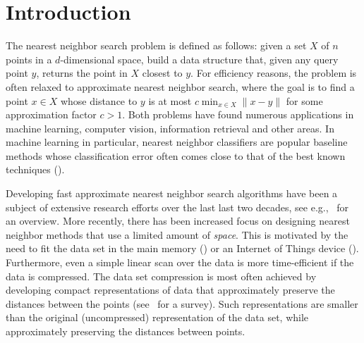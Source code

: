 \section{Introduction}


The nearest neighbor search problem is defined as follows: given a set $X$ of $n$ points in a $d$-dimensional space, build a data structure that, given any query point $y$, returns the point in $X$ closest to $y$. For efficiency reasons, the problem is often relaxed to approximate nearest neighbor search, where the goal is to find a point $x \in X$ whose distance to $y$ is at most $c \min_{x \in X} \|x-y\|$ for some approximation factor $c>1$. Both problems have found numerous applications in machine learning, computer vision,  information retrieval and other areas. In machine learning in particular, nearest neighbor classifiers are popular baseline methods whose classification error often comes close to that of the best known techniques (\cite{efros}).


Developing fast approximate nearest neighbor search algorithms have been a subject of extensive research efforts over the last last two decades, see  e.g.,~\cite{shakhnarovich2006nearest,AI} for an overview.  More recently, there has been increased focus on  designing nearest neighbor methods that use a limited amount of {\em space}. This is motivated by the need to fit  the data set in the main memory (\cite{johnson2017billion,faiss}) or an Internet of Things device (\cite{gupta2017protonn}).  Furthermore, even a simple linear scan over the data is more time-efficient if the data is compressed. 
The data set compression is most often achieved 
by developing compact representations of data that approximately preserve the distances between the points (see~\cite{wang2016learning} for a survey). 
Such representations are smaller than the original (uncompressed) representation of the data set, while  approximately preserving the distances between points.  

